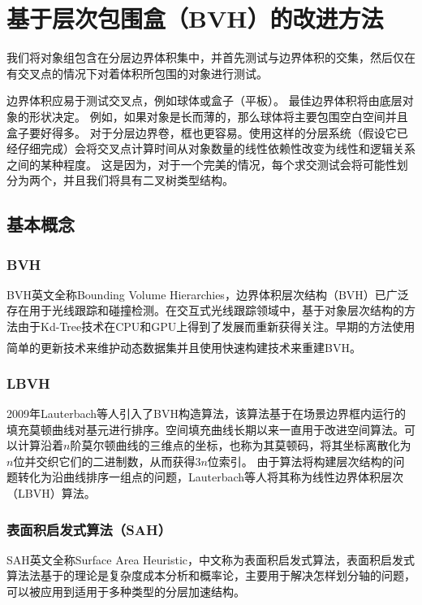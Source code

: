 \documentclass[11pt]{article}
\newcommand{\upcite}[1]{\textsuperscript{\textsuperscript{\cite{#1}}}}
\begin{document}
\section{基于层次包围盒（BVH）的改进方法}
我们将对象组包含在分层边界体积集中，并首先测试与边界体积的交集，然后仅在有交叉点的情况下对着体积所包围的对象进行测试。
\par 边界体积应易于测试交叉点，例如球体或盒子（平板）。 最佳边界体积将由底层对象的形状决定。 例如，如果对象是长而薄的，那么球体将主要包围空白空间并且盒子要好得多。 对于分层边界卷，框也更容易。使用这样的分层系统（假设它已经仔细完成）会将交叉点计算时间从对象数量的线性依赖性改变为线性和逻辑关系之间的某种程度。 这是因为，对于一个完美的情况，每个求交测试会将可能性划分为两个，并且我们将具有二叉树类型结构。
\subsection{基本概念}
\subsubsection{BVH}
BVH英文全称Bounding Volume Hierarchies，边界体积层次结构（BVH）已广泛存在用于光线跟踪和碰撞检测。在交互式光线跟踪领域中，基于对象层次结构的方法由于Kd-Tree技术在CPU和GPU上得到了发展而重新获得关注。早期的方法使用简单的更新技术来维护动态数据集并且使用快速构建技术来重建BVH\upcite{LBVH}。

\subsubsection{LBVH}
2009年Lauterbach等人引入了BVH构造算法，该算法基于在场景边界框内运行的填充莫顿曲线对基元进行排序。空间填充曲线长期以来一直用于改进空间算法。可以计算沿着$n$阶莫尔顿曲线的三维点的坐标，也称为其莫顿码，将其坐标离散化为$n$位并交织它们的二进制数，从而获得$3n$位索引。 由于算法将构建层次结构的问题转化为沿曲线排序一组点的问题，Lauterbach等人将其称为线性边界体积层次（LBVH）算法。

\subsubsection{表面积启发式算法（SAH）}
SAH英文全称Surface Area Heuristic，中文称为表面积启发式算法，表面积启发式算法法基于的理论是复杂度成本分析和概率论，主要用于解决怎样划分轴的问题，可以被应用到适用于多种类型的分层加速结构。
\end{document}
